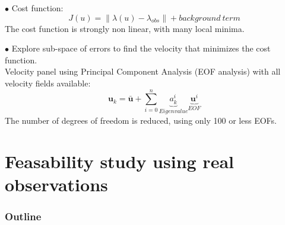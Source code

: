 \documentclass[compress,slidescentered,notes=show]{beamer}
\begin{document}
\begin{frame}
  \begin{block}{}
    $\bullet$ Cost function:
    $$J(u)=\|\lambda(u)- \lambda_{obs}\| + background\ term $$
    The cost function is strongly non linear, with many local minima.\\
  \end{block}
  \vspace{0.6cm}
  \begin{block}{}
    $\bullet$ Explore sub-space of errors to find the velocity that minimizes the cost function. \\
    Velocity panel using Principal Component Analysis (EOF analysis) with all velocity fields available:
    $$\textbf{u}_k = \bar{\textbf{u}} + \sum_{i=0}^n{\underbrace{a_k^i}_{Eigenvalue}\underbrace{\textbf{u}^i}_{EOF_{}}}$$
    The number of degrees of freedom is reduced, using only 100 or less EOFs. \\
  \end{block}
  \vspace{0.2cm}

\end{frame}


\section[Real data]{Feasability study using real observations}
\begin{frame}
  \frametitle{Outline}
  \tableofcontents[currentsection]
\end{frame}
\end{document}
